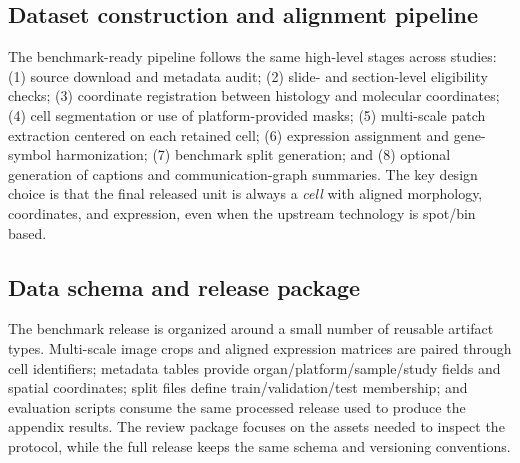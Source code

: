 \documentclass{article}
\begin{document}
\FloatBarrier

\subsection{Dataset construction and alignment pipeline}
The benchmark-ready pipeline follows the same high-level stages across studies: (1) source download and metadata audit; (2) slide- and section-level eligibility checks; (3) coordinate registration between histology and molecular coordinates; (4) cell segmentation or use of platform-provided masks; (5) multi-scale patch extraction centered on each retained cell; (6) expression assignment and gene-symbol harmonization; (7) benchmark split generation; and (8) optional generation of captions and communication-graph summaries. The key design choice is that the final released unit is always a \emph{cell} with aligned morphology, coordinates, and expression, even when the upstream technology is spot/bin based.

\subsection{Data schema and release package}
The benchmark release is organized around a small number of reusable artifact types. Multi-scale image crops and aligned expression matrices are paired through cell identifiers; metadata tables provide organ/platform/sample/study fields and spatial coordinates; split files define train/validation/test membership; and evaluation scripts consume the same processed release used to produce the appendix results. The review package focuses on the assets needed to inspect the protocol, while the full release keeps the same schema and versioning conventions.
\end{document}
